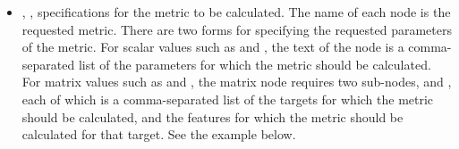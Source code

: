 \begin{itemize}
  \item {}, ,
    specifications for the metric to be calculated.  The name of each node is the requested metric.  There are
    two forms for specifying the requested parameters of the metric.  For scalar values such as
     and , the text of the node is a comma-separated list of the
    parameters for which the metric should be calculated.  For matrix values such as  and
    , the matrix node requires two sub-nodes,  and ,
    each of which is a comma-separated list of the targets for which the metric should be calculated, and the
    features for which the metric should be calculated for that target.  See the example below.


\end{itemize}
